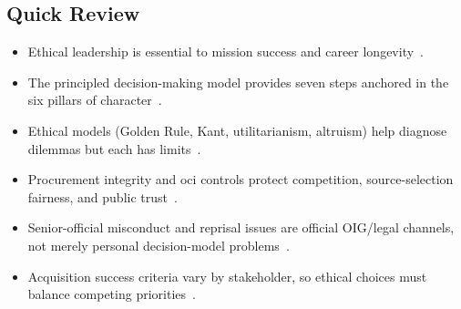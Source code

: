 \documentclass[../main.tex]{subfiles}
\begin{document}
\subsection{Quick Review}
\begin{itemize}
  \item Ethical leadership is essential to mission success and career longevity~\autocite{edo-5-1-3-ethics-and-acquisition-2025}.
  \item The principled decision-making model provides seven steps anchored in the six pillars of character~\autocite{edo-5-1-3-ethics-and-acquisition-2025}.
  \item Ethical models (Golden Rule, Kant, utilitarianism, altruism) help diagnose dilemmas but each has limits~\autocite{edo-5-1-3-ethics-and-acquisition-2025}.
  \item Procurement integrity and \ac{oci} controls protect competition, source-selection fairness, and public trust~\autocite{FAR-3-104-Procurement-Integrity,FAR-9-504-OCI}.
  \item Senior-official misconduct and reprisal issues are official OIG/legal channels, not merely personal decision-model problems~\autocite{DoW-OIG-Admin-Investigations-2026,DoW-OIG-AI-Manual-2025}.
  \item Acquisition success criteria vary by stakeholder, so ethical choices must balance competing priorities~\autocite{edo-5-1-3-ethics-and-acquisition-2025}.
\end{itemize}

\end{document}
